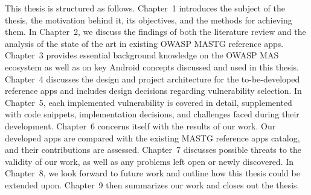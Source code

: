 This thesis is structured as follows. Chapter~1 introduces the subject of the thesis, the motivation behind it, its objectives, and the methods for achieving them. In Chapter~2, we discuss the findings of both the literature review and the analysis of the state of the art in existing OWASP MASTG reference apps. Chapter~3 provides essential background knowledge on the OWASP MAS ecosystem as well as on key Android concepts discussed and used in this thesis. Chapter~4 discusses the design and project architecture for the to-be-developed reference apps and includes design decisions regarding vulnerability selection. In Chapter~5, each implemented vulnerability is covered in detail, supplemented with code snippets, implementation decisions, and challenges faced during their development. Chapter~6 concerns itself with the results of our work. Our developed apps are compared with the existing MASTG reference apps catalog, and their contributions are assessed. Chapter~7 discusses possible threats to the validity of our work, as well as any problems left open or newly discovered. In Chapter~8, we look forward to future work and outline how this thesis could be extended upon. Chapter~9 then summarizes our work and closes out the thesis.